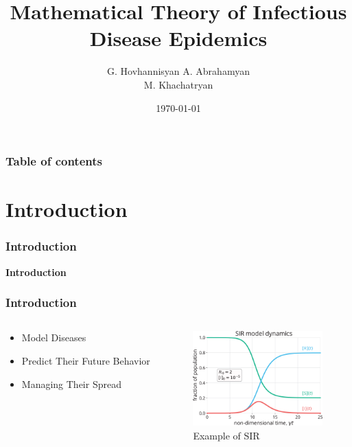 \documentclass{beamer}
\begin{document}
\title{Mathematical Theory of Infectious Disease Epidemics}
\author{G. Hovhannisyan  A. Abrahamyan\\
M. Khachatryan}
\date{\today}


\begin{frame}
\titlepage
\end{frame}

\begin{frame}\frametitle{Table of contents}\tableofcontents
\end{frame}


\section{Introduction}
\begin{frame}\frametitle{Introduction}
    \begin{center}
        \textbf{Introduction}
    \end{center}
    \end{frame}

\begin{frame}\frametitle{Introduction}
\begin{center}
    \begin{columns}
        \begin{column}{5cm}
        \begin{itemize}
        \item Model Diseases
        \item Predict Their Future Behavior
        \item Managing Their Spread
        \end{itemize}
        \end{column}
        \begin{column}{5cm}
        \begin{figure}
            \caption{Example of SIR}
	        \centering
	        \includegraphics[width=5cm]{Figure_SIR.png}
        \end{figure}
        \end{column}
        \end{columns}

\end{center}
\end{frame}
\end{document}
